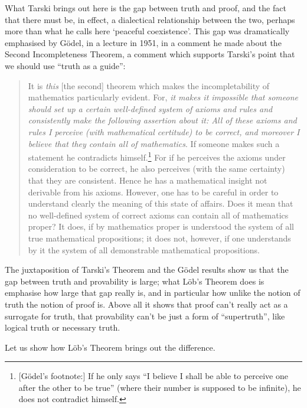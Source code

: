 What Tarski brings out here is the gap between truth and proof, and
the fact that there must be, in effect, a dialectical relationship
between the two, perhaps more than what he calls here `peaceful
coexistence'. This gap was dramatically emphasised by G\"odel, in  a
lecture in 1951, in a comment he made about the Second Incompleteness
Theorem, a comment which supports Tarski's point that we should use
``truth as a guide'':
\begin{quote}
It is \emph{this} [the second] theorem which makes the
incompletability of mathematics particularly evident. For, \emph{it
makes it impossible that someone should set up a certain well-defined
system of axioms and rules and consistently make the following
assertion about it: All of these axioms and rules I perceive (with
mathematical certitude) to be correct, and moreover I believe that
they contain all of mathematics}. If someone makes such a statement he
contradicts himself.\footnote{[G\"odel's footnote:] If he only says
``I believe I shall be able to perceive one after the other to be
true'' (where their number is supposed to be infinite), he does not
contradict himself.} For if he perceives the axioms under
consideration to be correct, he also perceives (with the same
certainty) that they are consistent. Hence he has a mathematical
insight not derivable from his axioms. However, one has to be careful
in order to understand clearly the meaning of this state of affairs.
Does it mean that no well-defined system of correct axioms can contain
all of mathematics proper? It does, if by mathematics proper is
understood the system of all true mathematical propositions; it does
not, however, if one understands by it the system of all demonstrable
mathematical propositions. \citep[p.~309]{Godel1951}
\end{quote}

The juxtaposition of Tarski's Theorem and the G\"odel results show us
that the gap between truth and provability is large; what L\"ob's
Theorem does is emphasise how large that gap really is, and in
particular how unlike the notion of truth the notion of proof is.
Above all it shows that  proof can't really act as a surrogate for
truth, that provability can't be just a form of ``supertruth'', like
logical truth or necessary truth.  

Let us show how L\"ob's Theorem brings out the difference. 

